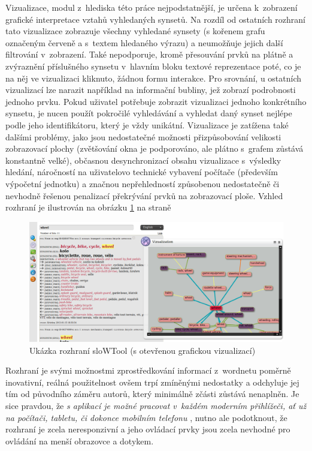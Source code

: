 \documentclass[a4paper,11pt,openany,twoside]{book}
\begin{document}
					Vizualizace, modul z~hlediska této práce nejpodstatnější, je určena k~zobrazení grafické interpretace vztahů vyhledaných synsetů. Na rozdíl od ostatních rozhraní tato vizualizace zobrazuje všechny vyhledané synsety (s kořenem grafu označeným červeně a s~textem hledaného výrazu) a neumožňuje jejich další filtrování v~zobrazení. Také nepodporuje, kromě přesouvání prvků na plátně a zvýraznění příslušného synsetu v~hlavním bloku textové reprezentace poté, co je na něj ve vizualizaci kliknuto, žádnou formu interakce. Pro srovnání, u ostatních vizualizací lze narazit například na informační bubliny, jež zobrazí podrobnosti jednoho prvku. Pokud uživatel potřebuje zobrazit vizualizaci jednoho konkrétního synsetu, je nucen použít pokročilé vyhledávání a vyhledat daný synset nejlépe podle jeho identifikátoru, který je vždy unikátní. Vizualizace je zatížena také dalšími problémy, jako jsou nedostatečné možnosti přizpůsobování velikosti zobrazovací plochy (zvětšování okna je podporováno, ale plátno s~grafem zůstává konstantně velké), občasnou desynchronizací obsahu vizualizace s~výsledky hledání, náročností na uživatelovo technické vybavení počítače (především výpočetní jednotku) a značnou nepřehledností způsobenou nedostatečně či nevhodně řešenou penalizací překrývání prvků na zobrazovací ploše. Vzhled rozhraní je ilustrován na obrázku \ref{fig:slowtool} na straně \pageref{fig:slowtool}

					\begin{figure}[h]
						\centering
						\includegraphics[width=1.0\textwidth]{slowtool.png}
						\caption{Ukázka rozhraní sloWTool (s otevřenou grafickou vizualizací)}
						\label{fig:slowtool}
					\end{figure}

					Rozhraní je svými možnostmi zprostředkování informací z~wordnetu poměrně inovativní, reálná použitelnost ovšem trpí zmíněnými nedostatky a odchyluje jej tím od původního záměru autorů, který minimálně zčásti zůstává nenaplněn. Je sice pravdou, že \textit{s aplikací je možné pracovat v~každém moderním přihlížeči, ať už na počítači, tabletu, či dokonce mobilním telefonu} \parencite{fivser2011visualizing}, nutno ale podotknout, že rozhraní je zcela neresponzivní a jeho ovládací prvky jsou zcela nevhodné pro ovládání na menší obrazovce a dotykem.
\end{document}

